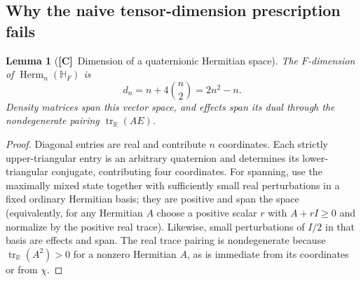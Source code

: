 \documentclass[11pt,oneside]{article}
\numberwithin{equation}{section}
\theoremstyle{plain}
\newtheorem{lemma}[lemma]{Lemma}
\theoremstyle{definition}
\theoremstyle{remark}
\newcommand{\R}{\mathbb R}
\newcommand{\HF}{\mathbb H_F}
\DeclareMathOperator{\tr}{tr}
\DeclareMathOperator{\Herm}{Herm}
\newcommand{\TC}{\textcolor{TierC}{\textsf{\bfseries[C]}}}
\begin{document}
\subsection{Why the naive tensor-dimension prescription fails}
\begin{lemma}[\TC\ Dimension of a quaternionic Hermitian space]\label{qgs:lem:quatdim}
The $F$-dimension of $\Herm_n(\HF)$ is
\[
 d_n=n+4\binom n2=2n^2-n.
\]
Density matrices span this vector space, and effects span its dual through the nondegenerate pairing $\tr_\R(AE)$.
\end{lemma}
\begin{proof}
Diagonal entries are real and contribute $n$ coordinates. Each strictly upper-triangular entry is an arbitrary quaternion and determines its lower-triangular conjugate, contributing four coordinates. For spanning, use the maximally mixed state together with sufficiently small real perturbations in a fixed ordinary Hermitian basis; they are positive and span the space (equivalently, for any Hermitian $A$ choose a positive scalar $r$ with $A+rI\ge0$ and normalize by the positive real trace). Likewise, small perturbations of $I/2$ in that basis are effects and span. The real trace pairing is nondegenerate because $\tr_\R(A^2)>0$ for a nonzero Hermitian $A$, as is immediate from its coordinates or from $\chi$.
\end{proof}
\end{document}
